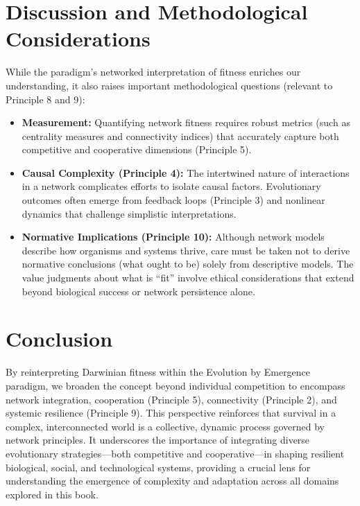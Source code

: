 \section{Discussion and Methodological Considerations}
While the paradigm's networked interpretation of fitness enriches our understanding, it also raises important methodological questions (relevant to Principle 8 and 9):
\begin{itemize}
    \item \textbf{Measurement:} Quantifying network fitness requires robust metrics (such as centrality measures and connectivity indices) that accurately capture both competitive and cooperative dimensions (Principle 5).
    \item \textbf{Causal Complexity (Principle 4):} The intertwined nature of interactions in a network complicates efforts to isolate causal factors. Evolutionary outcomes often emerge from feedback loops (Principle 3) and nonlinear dynamics that challenge simplistic interpretations.
    \item \textbf{Normative Implications (Principle 10):} Although network models describe how organisms and systems thrive, care must be taken not to derive normative conclusions (what ought to be) solely from descriptive models. The value judgments about what is “fit” involve ethical considerations that extend beyond biological success or network persistence alone.
\end{itemize} %

\section{Conclusion}
By reinterpreting Darwinian fitness within the Evolution by Emergence paradigm, we broaden the concept beyond individual competition to encompass network integration, cooperation (Principle 5), connectivity (Principle 2), and systemic resilience (Principle 9). This perspective reinforces that survival in a complex, interconnected world is a collective, dynamic process governed by network principles. It underscores the importance of integrating diverse evolutionary strategies—both competitive and cooperative—in shaping resilient biological, social, and technological systems, providing a crucial lens for understanding the emergence of complexity and adaptation across all domains explored in this book. %
\cleardoublepage